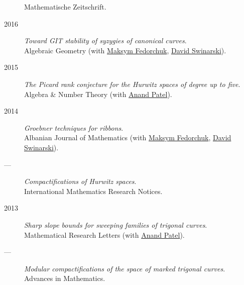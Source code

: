\documentclass[11pt]{article}
\begin{document}
\begin{description}
Mathematische Zeitschrift.
\item[{2016}] \emph{Toward GIT stability of syzygies of canonical curves}.\\
Algebraic Geometry (with \href{https://www2.bc.edu/maksym-fedorchuk/}{Maksym Fedorchuk}, \href{http://faculty.fordham.edu/dswinarski/}{David Swinarski}).
\item[{2015}] \emph{The Picard rank conjecture for the Hurwitz spaces of degree up to five}.\\
Algebra \& Number Theory (with \href{https://www2.bc.edu/anand-p-patel/}{Anand Patel}).
\item[{2014}] \emph{Groebner techniques for ribbons}.\\
Albanian Journal of Mathematics (with \href{https://www2.bc.edu/maksym-fedorchuk/}{Maksym Fedorchuk}, \href{http://faculty.fordham.edu/dswinarski/}{David Swinarski}).
\item[{---}] \emph{Compactifications of Hurwitz spaces}.\\
International Mathematics Research Notices.
\item[{2013}] \emph{Sharp slope bounds for sweeping families of trigonal curves}.\\
Mathematical Research Letters (with \href{https://sites.google.com/view/anand-patel}{Anand Patel}).
\item[{---}] \emph{Modular compactifications of the space of marked trigonal curves}.\\
Advances in Mathematics.
\end{description}
\end{document}
